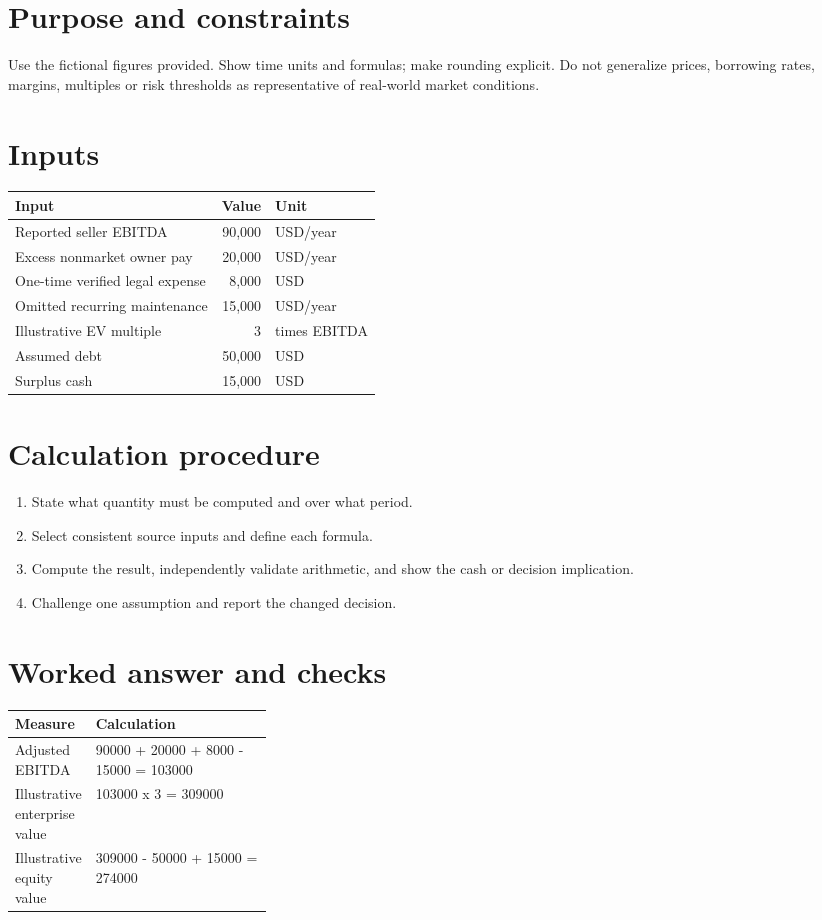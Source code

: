 \documentclass[11pt]{article}
\begin{document}
\SuiteOpen
\section{Purpose and constraints}
Use the fictional figures provided. Show time units and formulas; make rounding explicit. Do not generalize prices, borrowing rates, margins, multiples or risk thresholds as representative of real-world market conditions.
\section{Inputs}
\begin{tabularx}{\linewidth}{@{}Y r l@{}}\toprule Input & Value & Unit\\\midrule
Reported seller EBITDA & 90,000 & USD/year\\
Excess nonmarket owner pay & 20,000 & USD/year\\
One-time verified legal expense & 8,000 & USD\\
Omitted recurring maintenance & 15,000 & USD/year\\
Illustrative EV multiple & 3 & times EBITDA\\
Assumed debt & 50,000 & USD\\
Surplus cash & 15,000 & USD\\
\bottomrule\end{tabularx}
\section{Calculation procedure}
\begin{enumerate}[leftmargin=*,itemsep=5pt]
\item State what quantity must be computed and over what period.
\item Select consistent source inputs and define each formula.
\item Compute the result, independently validate arithmetic, and show the cash or decision implication.
\item Challenge one assumption and report the changed decision.
\end{enumerate}

\section{Worked answer and checks}
\begin{tabularx}{\linewidth}{@{}p{0.30\linewidth}Y@{}}\toprule Measure & Calculation\\\midrule
Adjusted EBITDA & 90000 + 20000 + 8000 - 15000 = 103000\\
Illustrative enterprise value & 103000 x 3 = 309000\\
Illustrative equity value & 309000 - 50000 + 15000 = 274000\\
\bottomrule\end{tabularx}
\end{document}
